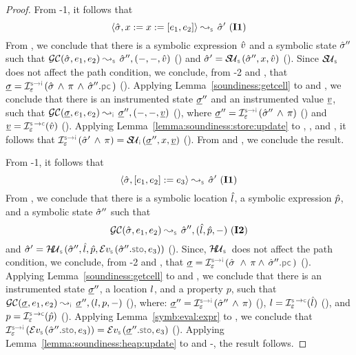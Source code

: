 \begin{proof}
 \noindent {} From \hyp{1}, it follows that 
 $$\absbsemrule{\sstate, \jvar := \jvar := [\jsilexpr_1, \jsilexpr_2]}{\sstate'}{\symbolic} \text{ (\ieq{1})}$$
From , we conclude that there is a symbolic expression $\hat{v}$ and a symbolic state $\hat{\sigma}''$ such that 
$\absgetcellrule{\symbolic}{\sstate, \jsilexpr_1, \jsilexpr_2}{\sstate'', (-, -, \sexprv)}$ () 
and $\sstate' = \stupdt{\symbolic}(\sstate'', \jvar, \sexprv)$ (). 
Since $\stupdt{\symbolic}$ does not affect the path condition, we conclude, from \hyp{2} and , that
$\istate = \interpret{\symbinst}{\senv}(\sstate \, \wedge \, \pc \, \wedge \, \sstate''.\pcsel)$ (). 
Applying Lemma~\ref{soundiness:getcell} to  and , we conclude that
there is an instrumented state $\underline{\sigma}''$ and an instrumented value $\underline{v}$, such that 
$\absgetcellrule{\instrumented}{\istate, \jsilexpr_1, \jsilexpr_2}{\istate'', (-, -, \ival)}$ (), 
where $\istate'' = \interpret{\symbinst}{\senv}(\sstate'' \, \wedge \, \pc)$ () and $\ival = \interpret{\symbconc}{\senv}(\sexprv)$ (). 
Applying Lemma~\ref{lemma:soundiness:store:update} to , , and , it follows
that  $\interpret{\symbinst}{\senv}(\sstate' \, \wedge \, \pc) = \stupdt{\instrumented}(\istate'', \jvar, \ival)$ (). 
From  and , we conclude the result. 
\vspace{5pt}

 \noindent {}
From \hyp{1}, it follows that 
$$\absbsemrule{\sstate, [\jsilexpr_1, \jsilexpr_2] := \jsilexpr_3}{\sstate'}{\symbolic} \text{ (\ieq{1})}$$
From , we conclude that there is a symbolic location $\hat{l}$, a symbolic expression $\hat{p}$, and a symbolic state $\hat{\sigma}''$ such that 
$$\absgetcellrule{\symbolic}{\sstate, \jsilexpr_1, \jsilexpr_2}{\sstate'', (\sloc, \sexprp, -)} \text{ (\ieq{2})}$$ and 
$\sstate' = \hpupdt{\symbolic}(\sstate'', \sloc, \sexprp, \evalexpr{\symbolic}(\sstate''.\stosel, \jsilexpr_3))$ (). 
Since, $\hpupdt{\symbolic}$ does not affect the path condition, we conclude, from \hyp{2} and , that
$\istate = \interpret{\symbinst}{\senv}(\sstate \, \, \wedge \, \pc \wedge \, \sstate''.\pcsel)$ (). 
Applying Lemma~\ref{soundiness:getcell} to  and , we conclude that
there is an instrumented state $\underline{\sigma}''$, a location $l$, and a property $p$, such that 
$\absgetcellrule{\instrumented}{\istate, \jsilexpr_1, \jsilexpr_2}{\istate'', (\loc, p, -)}$ (), 
where: $\istate'' = \interpret{\symbinst}{\senv}(\sstate'' \, \wedge \, \pc)$ (), 
 $\loc = \interpret{\symbconc}{\senv}(\sloc)$ (), and  $p = \interpret{\symbconc}{\senv}(\sexprp)$ ().
Applying Lemma~\ref{symb:eval:expr} to , we conclude that 
$\interpret{\symbinst}{\senv}(\evalexpr{\symbolic}(\sstate''.\stosel, \jsilexpr_3)) = \evalexpr{\symbolic}(\istate''.\stosel, \jsilexpr_3)$ (). 
Applying Lemma~\ref{lemma:soundiness:heap:update} to  and -, the result follows.
\vspace{5pt} 


\end{proof}
